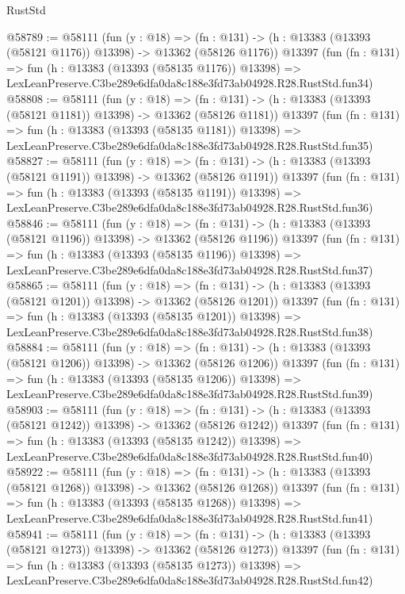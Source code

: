 \begin{lexlean}{RustStd}
\begin{coremodule}
@58789 := @58111
    (fun (y : @18) =>
    (fn : @131) -> (h : @13383 (@13393 (@58121 @1176)) @13398) -> @13362 (@58126 @1176))
    @13397
    (fun (fn : @131) =>
    fun (h : @13383 (@13393 (@58135 @1176)) @13398) =>
    LexLeanPreserve.C3be289e6dfa0da8c188e3fd73ab04928.R28.RustStd.fun34)
@58808 := @58111
    (fun (y : @18) =>
    (fn : @131) -> (h : @13383 (@13393 (@58121 @1181)) @13398) -> @13362 (@58126 @1181))
    @13397
    (fun (fn : @131) =>
    fun (h : @13383 (@13393 (@58135 @1181)) @13398) =>
    LexLeanPreserve.C3be289e6dfa0da8c188e3fd73ab04928.R28.RustStd.fun35)
@58827 := @58111
    (fun (y : @18) =>
    (fn : @131) -> (h : @13383 (@13393 (@58121 @1191)) @13398) -> @13362 (@58126 @1191))
    @13397
    (fun (fn : @131) =>
    fun (h : @13383 (@13393 (@58135 @1191)) @13398) =>
    LexLeanPreserve.C3be289e6dfa0da8c188e3fd73ab04928.R28.RustStd.fun36)
@58846 := @58111
    (fun (y : @18) =>
    (fn : @131) -> (h : @13383 (@13393 (@58121 @1196)) @13398) -> @13362 (@58126 @1196))
    @13397
    (fun (fn : @131) =>
    fun (h : @13383 (@13393 (@58135 @1196)) @13398) =>
    LexLeanPreserve.C3be289e6dfa0da8c188e3fd73ab04928.R28.RustStd.fun37)
@58865 := @58111
    (fun (y : @18) =>
    (fn : @131) -> (h : @13383 (@13393 (@58121 @1201)) @13398) -> @13362 (@58126 @1201))
    @13397
    (fun (fn : @131) =>
    fun (h : @13383 (@13393 (@58135 @1201)) @13398) =>
    LexLeanPreserve.C3be289e6dfa0da8c188e3fd73ab04928.R28.RustStd.fun38)
@58884 := @58111
    (fun (y : @18) =>
    (fn : @131) -> (h : @13383 (@13393 (@58121 @1206)) @13398) -> @13362 (@58126 @1206))
    @13397
    (fun (fn : @131) =>
    fun (h : @13383 (@13393 (@58135 @1206)) @13398) =>
    LexLeanPreserve.C3be289e6dfa0da8c188e3fd73ab04928.R28.RustStd.fun39)
@58903 := @58111
    (fun (y : @18) =>
    (fn : @131) -> (h : @13383 (@13393 (@58121 @1242)) @13398) -> @13362 (@58126 @1242))
    @13397
    (fun (fn : @131) =>
    fun (h : @13383 (@13393 (@58135 @1242)) @13398) =>
    LexLeanPreserve.C3be289e6dfa0da8c188e3fd73ab04928.R28.RustStd.fun40)
@58922 := @58111
    (fun (y : @18) =>
    (fn : @131) -> (h : @13383 (@13393 (@58121 @1268)) @13398) -> @13362 (@58126 @1268))
    @13397
    (fun (fn : @131) =>
    fun (h : @13383 (@13393 (@58135 @1268)) @13398) =>
    LexLeanPreserve.C3be289e6dfa0da8c188e3fd73ab04928.R28.RustStd.fun41)
@58941 := @58111
    (fun (y : @18) =>
    (fn : @131) -> (h : @13383 (@13393 (@58121 @1273)) @13398) -> @13362 (@58126 @1273))
    @13397
    (fun (fn : @131) =>
    fun (h : @13383 (@13393 (@58135 @1273)) @13398) =>
    LexLeanPreserve.C3be289e6dfa0da8c188e3fd73ab04928.R28.RustStd.fun42)

\end{coremodule}
\end{lexlean}

